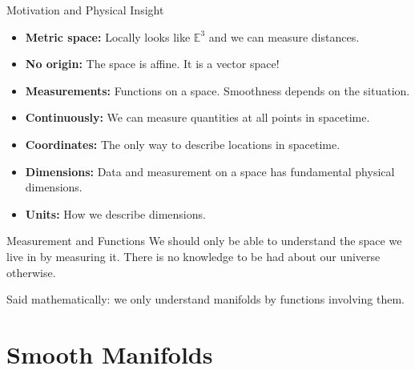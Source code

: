 \documentclass[usenames,dvipsnames]{beamer}
\theoremstyle{definition}
\theoremstyle{theorem}
\begin{document}
        \begin{frame}{Motivation and Physical Insight}
            \begin{itemize}
                \item \textbf{Metric space:} Locally looks like $\mathbb{E}^3$ and we can measure distances.
                \item \textbf{No origin:} The space is affine.  It is  a vector space!
                \item \textbf{Measurements:} Functions on a space. Smoothness depends on the situation. 
                \item \textbf{Continuously:} We can measure quantities at all points in spacetime.
                \item \textbf{Coordinates:} The only way to describe locations in spacetime.
                \item \textbf{Dimensions:} Data and measurement on a space has fundamental physical dimensions.
                \item \textbf{Units:} How we describe dimensions. 
            \end{itemize}
        \end{frame}
        
        \begin{frame}{Measurement and Functions}
            We should only be able to understand the space we live in by measuring it.  There is no knowledge to be had about our universe otherwise.  
            \vspace*{0.5cm}
            
            Said mathematically: we only understand manifolds by functions involving them.
        \end{frame}


\section{Smooth Manifolds}
    
\end{document}

